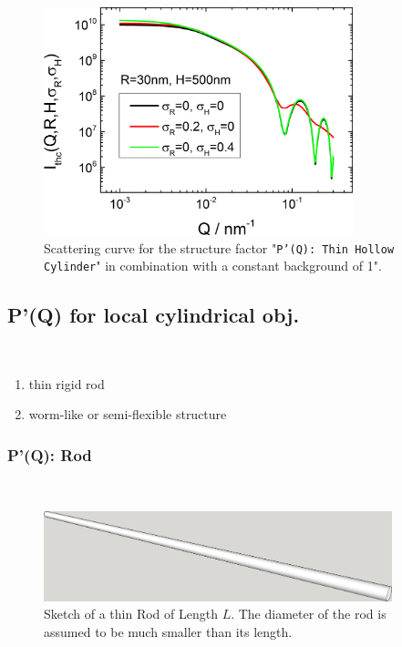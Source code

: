 \begin{figure}[htb]
\begin{center}
\includegraphics[width=0.8\textwidth,height=0.55\textwidth]{../images/form_factor/anisotropic/PprimeThinHollowCylinder.png}
\end{center}
\caption{Scattering curve for the structure factor "\texttt{P'(Q): Thin Hollow Cylinder}" in combination with a constant background of 1".}
\label{fig_IQ:PprimeThinHollowCylinder}
\end{figure}


\clearpage
\subsection{P'(Q) for local cylindrical obj.} ~\\
\label{plugin:Pprime4cylindrical}
\begin{enumerate}
\item thin rigid rod
\item worm-like or semi-flexible structure
\end{enumerate}

\clearpage
\subsubsection{P'(Q): Rod} ~\\
\label{plugin:Pprime4rods}

\begin{figure}[htb]
\begin{center}
\includegraphics[width=0.9\textwidth]{../images/form_factor/anisotropic/ThinRod.png}
\end{center}
\caption{Sketch of a thin Rod of Length $L$. The diameter of the rod is assumed to be much smaller than its length.}
\label{fig:ThinRod}
\end{figure}


